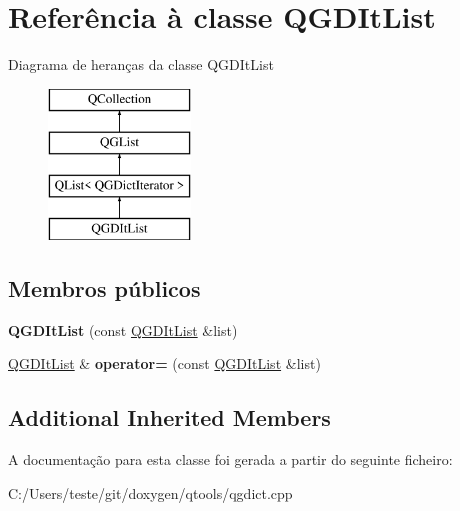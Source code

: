 \hypertarget{class_q_g_d_it_list}{\section{Referência à classe Q\-G\-D\-It\-List}
\label{class_q_g_d_it_list}
}
Diagrama de heranças da classe Q\-G\-D\-It\-List\begin{figure}[H]
\begin{center}
\leavevmode
\includegraphics[height=4.000000cm]{class_q_g_d_it_list}
\end{center}
\end{figure}
\subsection*{Membros públicos}
\begin{DoxyCompactItemize}
\item 
\hypertarget{class_q_g_d_it_list_a56319ba3c72735bef1e5f136c5ccab86}{{\bfseries Q\-G\-D\-It\-List} (const \hyperlink{class_q_g_d_it_list}{Q\-G\-D\-It\-List} \&list)}\label{class_q_g_d_it_list_a56319ba3c72735bef1e5f136c5ccab86}

\item 
\hypertarget{class_q_g_d_it_list_a2abbec1d4a877669dd81072282a8744d}{\hyperlink{class_q_g_d_it_list}{Q\-G\-D\-It\-List} \& {\bfseries operator=} (const \hyperlink{class_q_g_d_it_list}{Q\-G\-D\-It\-List} \&list)}\label{class_q_g_d_it_list_a2abbec1d4a877669dd81072282a8744d}

\end{DoxyCompactItemize}
\subsection*{Additional Inherited Members}


A documentação para esta classe foi gerada a partir do seguinte ficheiro\-:\begin{DoxyCompactItemize}
\item 
C\-:/\-Users/teste/git/doxygen/qtools/qgdict.\-cpp\end{DoxyCompactItemize}

